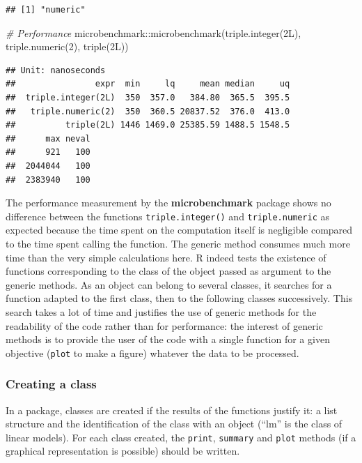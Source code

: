 \documentclass[
  12pt,
  american,
  a4paper,
  extrafontsizes,onecolumn,openright
  ]{memoir}
\newenvironment{Shaded}{\begin{snugshade}}{\end{snugshade}}
\newcommand{\CommentTok}[1]{\textcolor[rgb]{0.56,0.35,0.01}{\textit{#1}}}
\newcommand{\DecValTok}[1]{\textcolor[rgb]{0.00,0.00,0.81}{#1}}
\newcommand{\FunctionTok}[1]{\textcolor[rgb]{0.00,0.00,0.00}{#1}}
\newcommand{\NormalTok}[1]{#1}
\newcommand{\SpecialCharTok}[1]{\textcolor[rgb]{0.00,0.00,0.00}{#1}}
\newlength{\rf}
\begin{document}
\begin{verbatim}
## [1] "numeric"
\end{verbatim}

\begin{Shaded}
\begin{Highlighting}[]
\CommentTok{\# Performance}
\NormalTok{microbenchmark}\SpecialCharTok{::}\FunctionTok{microbenchmark}\NormalTok{(}\FunctionTok{triple.integer}\NormalTok{(2L), }\FunctionTok{triple.numeric}\NormalTok{(}\DecValTok{2}\NormalTok{),}
    \FunctionTok{triple}\NormalTok{(2L))}
\end{Highlighting}
\end{Shaded}

\begin{verbatim}
## Unit: nanoseconds
##                expr  min     lq     mean median     uq
##  triple.integer(2L)  350  357.0   384.80  365.5  395.5
##   triple.numeric(2)  350  360.5 20837.52  376.0  413.0
##          triple(2L) 1446 1469.0 25385.59 1488.5 1548.5
##      max neval
##      921   100
##  2044044   100
##  2383940   100
\end{verbatim}

\normalsize

The performance measurement by the \textbf{microbenchmark} package shows no difference between the functions \texttt{triple.integer()} and \texttt{triple.numeric} as expected because the time spent on the computation itself is negligible compared to the time spent calling the function.
The generic method consumes much more time than the very simple calculations here.
R indeed tests the existence of functions corresponding to the class of the object passed as argument to the generic methods.
As an object can belong to several classes, it searches for a function adapted to the first class, then to the following classes successively.
This search takes a lot of time and justifies the use of generic methods for the readability of the code rather than for performance: the interest of generic methods is to provide the user of the code with a single function for a given objective (\texttt{plot} to make a figure) whatever the data to be processed.

\hypertarget{creating-a-class}{%
\subsubsection{Creating a class}\label{creating-a-class}}

In a package, classes are created if the results of the functions justify it: a list structure and the identification of the class with an object (\enquote{lm} is the class of linear models).
For each class created, the \texttt{print}, \texttt{summary} and \texttt{plot} methods (if a graphical representation is possible) should be written.
\end{document}
